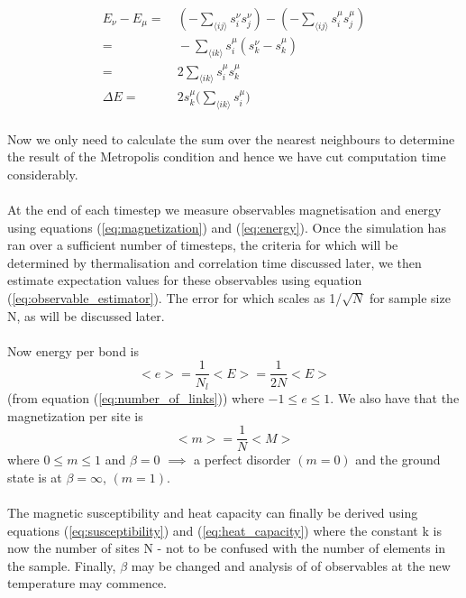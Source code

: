 \documentclass[12pt] {report} %
\begin{document}
				\begin{align}
					E_\nu - E_\mu =& \:(-\sum_{\langle ij \rangle}s_i^\nu s_j^\nu) - (-\sum_{\langle ij \rangle}s_i^\mu s_j^\mu) \nonumber \\
					=& \:-\sum_{\langle ik \rangle} s_i^\mu(s_k^\nu - s_k^\mu) \nonumber \\
					=& \:2\sum_{\langle ik \rangle}s_i^\mu s_k^\mu \nonumber \\
					\Delta E =& \:2 s_k^\mu \Big( \sum_{\langle ik \rangle} s_i^\mu \Big) 		\label{eq:delta_E}
				\end{align}
				
				\paragraph{}
					Now we only need to calculate the sum over the nearest neighbours to determine the result of the Metropolis condition and hence we have cut computation time considerably.
					
				\paragraph{}
					At the end of each timestep we measure observables magnetisation and energy using equations (\ref{eq:magnetization}) and (\ref{eq:energy}). Once the simulation has ran over a sufficient number of timesteps, the criteria for which will be determined by thermalisation and correlation time discussed later, we then estimate expectation values for these observables using equation (\ref{eq:observable_estimator}). The error for which scales as 1/$\sqrt{N}$ for sample size N, as will be discussed later.
					
				\paragraph{}
					Now energy per bond is $$<e>=\frac{1}{N_l}<E> = \dfrac{1}{2N}<E>$$ (from equation (\ref{eq:number_of_links})) where $-1 \leq e \leq 1$. We also have that the magnetization per site is $$<m>=\frac{1}{N}<M>$$ where $0 \leq m \leq 1$ and $\beta = 0$ $\implies$ a perfect disorder $(m=0)$ and the ground state is at $\beta = \infty$, $(m=1)$.
					
				\paragraph{}
					The magnetic susceptibility and heat capacity can finally be derived using equations (\ref{eq:susceptibility}) and (\ref{eq:heat_capacity}) where the constant k is now the number of sites N - not to be confused with the number of elements in the sample. Finally, $\beta$ may be changed and analysis of of observables at the new temperature may commence. 
				
\end{document}
